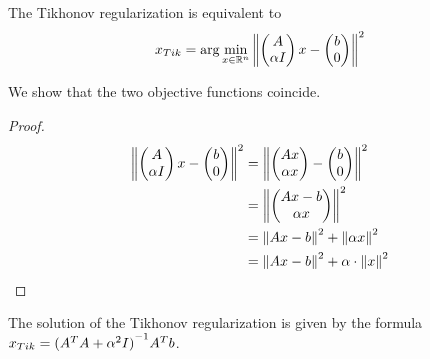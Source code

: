 \documentclass[computational_mathematics.tex]{subfiles}
\begin{document}
\begin{proposition}
The Tikhonov regularization is equivalent to 
\begin{equation} \label{eq:7novxtik}
  x_{Tik} = \arg \min_{x\in\mathbb{R}^n} {\left\lVert\begin{pmatrix}
    A\\
    \alpha I
\end{pmatrix} x - \begin{pmatrix}
    b\\0
\end{pmatrix}\right\rVert}^2
\end{equation}
\end{proposition}
We show that the two objective functions coincide.
\begin{proof}
  \begin{equation}
    \begin{aligned}
      {\left\lVert\begin{pmatrix}
        A\\
        \alpha I
      \end{pmatrix} x -
      \begin{pmatrix}
        b\\0
      \end{pmatrix}\right\rVert}^2 &= {\left\lVert\begin{pmatrix}
        Ax\\
        \alpha x
      \end{pmatrix} -
      \begin{pmatrix}
        b\\0
      \end{pmatrix}\right\rVert}^2\\
      &= {\left\lVert\begin{pmatrix}
        Ax - b\\
        \alpha x
      \end{pmatrix}\right\rVert}^2\\
      &= {\left\lVert Ax-b\right\rVert}^2 + {\left\lVert\alpha x\right\rVert}^2\\
      &= {\left\lVert Ax-b\right\rVert}^2 + \alpha \cdot {\left\lVert x\right\rVert}^2\\
    \end{aligned}
  \end{equation}
\end{proof}

\begin{proposition}
The solution of the Tikhonov regularization is given by the formula $x_{Tik}={({A}^{T}A + {\alpha}^{2} I)}^{-1}{A}^{T} b$.
\end{proposition}
\end{document}
